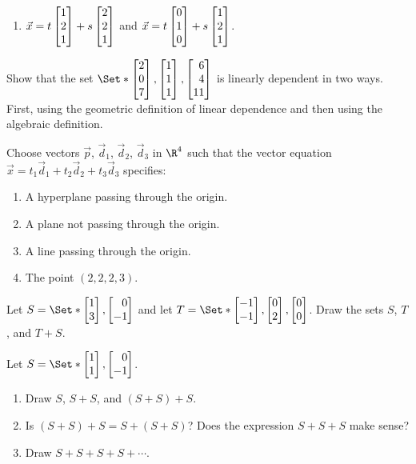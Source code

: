 \begin{exercises}
\begin{problist}
\begin{enumerate}
			\item $\vec x = t\mat{1\\2\\1}+ s\mat{2\\2\\1}$ and $\vec
				x = t\mat{0\\1\\0}+ s\mat{1\\2\\1}$.
		\end{enumerate}
		
		\prob Show that the set $\Set*{\mat{2\\0\\7},\mat{1\\1\\1},\mat{6\\4\\11}}$
		is linearly dependent in two ways. First, using the geometric definition of linear dependence
		and then using the algebraic definition.

		\prob Choose vectors $\vec p$, $\vec d_{1}$, $\vec d_{2}$,
		$\vec d_{3}$ in $\R^{4}$ such that the vector equation
		$\vec x = t_{1}\vec d_{1} + t_{2}\vec d_{2} + t_{3}\vec d_{3}$ specifies:
		\begin{enumerate}
			\item A hyperplane passing through the origin.

			\item A plane not passing through the origin.

			\item A line passing through the origin.

			\item The point $(2,2,2,3)$.
		\end{enumerate}

		\prob Let $S=\Set*{\mat{1\\3},\mat{0\\-1}}$ and let $T=\Set*{\mat{-1\\-1},\mat{0\\2},\mat{0\\0}}$. Draw
		the sets $S$, $T$, and $T+S$.

		\prob Let $S=\Set*{\mat{1\\1},\mat{0\\-1}}$. 
		\begin{enumerate}
			\item 
				Draw $S$, $S+S$, and $(S+S)+S$.
			\item Is $(S+S)+S=S+(S+S)$? Does the expression $S+S+S$ make sense?
			\item Draw $S+S+S+S+\cdots$.
		\end{enumerate}


\end{problist}
\end{exercises}
